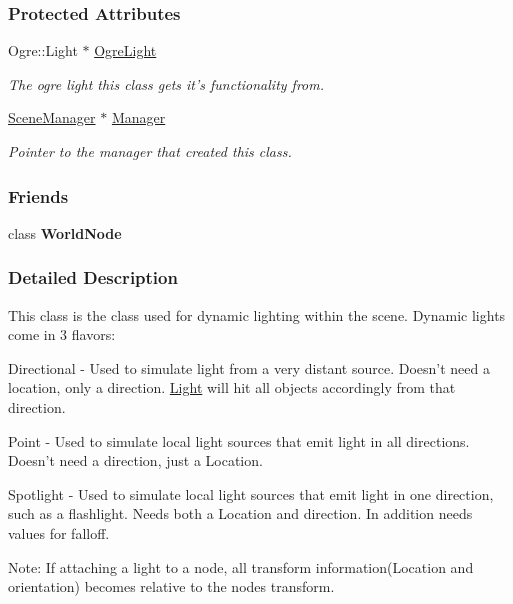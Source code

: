 \subsubsection*{Protected Attributes}
\begin{DoxyCompactItemize}
\item 
\hypertarget{classphys_1_1Light_a20fc9136847907955cfb8c1a47d6ec6a}{
Ogre::Light $\ast$ \hyperlink{classphys_1_1Light_a20fc9136847907955cfb8c1a47d6ec6a}{OgreLight}}
\label{dc/df1/classphys_1_1Light_a20fc9136847907955cfb8c1a47d6ec6a}

\begin{DoxyCompactList}\small\item\em The ogre light this class gets it's functionality from. \item\end{DoxyCompactList}\item 
\hypertarget{classphys_1_1Light_a2633fc1795d2a3e2ddddc71674a7eb84}{
\hyperlink{classphys_1_1SceneManager}{SceneManager} $\ast$ \hyperlink{classphys_1_1Light_a2633fc1795d2a3e2ddddc71674a7eb84}{Manager}}
\label{dc/df1/classphys_1_1Light_a2633fc1795d2a3e2ddddc71674a7eb84}

\begin{DoxyCompactList}\small\item\em Pointer to the manager that created this class. \item\end{DoxyCompactList}\end{DoxyCompactItemize}
\subsubsection*{Friends}
\begin{DoxyCompactItemize}
\item 
\hypertarget{classphys_1_1Light_a1cacd07efb11226da49a7c80569b18e8}{
class {\bfseries WorldNode}}
\label{dc/df1/classphys_1_1Light_a1cacd07efb11226da49a7c80569b18e8}

\end{DoxyCompactItemize}


\subsubsection{Detailed Description}
This class is the class used for dynamic lighting within the scene. Dynamic lights come in 3 flavors: \par
 Directional -\/ Used to simulate light from a very distant source. Doesn't need a location, only a direction. \hyperlink{classphys_1_1Light}{Light} will hit all objects accordingly from that direction. \par
 Point -\/ Used to simulate local light sources that emit light in all directions. Doesn't need a direction, just a Location. \par
 Spotlight -\/ Used to simulate local light sources that emit light in one direction, such as a flashlight. Needs both a Location and direction. In addition needs values for falloff. \par
 Note: If attaching a light to a node, all transform information(Location and orientation) becomes relative to the nodes transform. 

